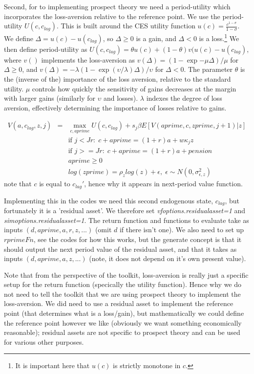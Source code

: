 Second, for to implementing prospect theory we need a period-utility which incorporates the loss-aversion relative to the reference point. We use the period-utility $U(c,c_{lag})$. This is built around the CES utility function $u(c)=\frac{c^{1-\sigma}}{1-\sigma}$. We define $\Delta=u(c)-u(c_{lag})$, so $\Delta \geq 0$ is a gain, and $\Delta <0$ is a loss.\footnote{It is important here that $u(c)$ is strictly monotone in $c$.} We then define period-utility as $U(c,c_{lag})=\theta u(c)+ (1-\theta) v(u(c)-u(c_{lag})$, where $v()$ implements the loss-aversion as  $v(\Delta)=(1-\exp{-\mu \Delta})/\mu$ for $\Delta \geq 0$, and $v(\Delta)=-\lambda (1- \exp{(\upsilon/\lambda)\Delta})/\upsilon$ for $\Delta < 0$. The parameter $\theta$ is the (inverse of the) importance of the loss aversion, relative to the standard utility. $\mu$ controls how quickly the sensitivity of gains decreases at the margin with larger gains (similarly for $\upsilon$ and losses). $\lambda$ indexes the degree of loss aversion, effectively determining the importance of losses relative to gains.

\begin{eqnarray*}
 V(a,c_{lag},z,j)&=& \max_{c,aprime} U(c,c_{lag})+ s_j \beta E[V(aprime,c,zprime,j+1)|z] \\
&& \text{if }j<Jr: \; c+aprime=(1+r)a+w \kappa_j z\\
&& \text{if }j>=Jr: \; c+aprime=(1+r)a +pension\\
&& aprime\geq 0 \\
&& log(zprime)=\rho_z log(z) + \epsilon, \; \epsilon \sim N(0,\sigma_{\epsilon,z}^2)
\end{eqnarray*}
note that $c$ is equal to $c_{lag}'$, hence why it appears in next-period value function.

Implementing this in the codes we need this second endogenous state, $c_{lag}$, but fortunately it is a 'residual asset'. We therefore set \textit{vfoptions.residualasset=1} and  \textit{simoptions.residualasset=1}. The return function and functions to evaluate take as inputs $(d,aprime,a,r,z,...)$ (omit $d$ if there isn't one). We also need to set up $rprimeFn$, see the codes for how this works, but the generate concept is that it should output the next period value of the residual asset, and that it takes as inputs $(d,aprime,a,z,...)$ (note, it does not depend on it's own present value).

Note that from the perspective of the toolkit, loss-aversion is really just a specific setup for the return function (specically the utility function). Hence why we do not need to tell the toolkit that we are using prospect theory to implement the loss-aversion. We did need to use a residual asset to implement the reference point (that determines what is a loss/gain), but mathematically we could define the reference point however we like (obviously we want something economically reasonable); residual assets are not specific to prospect theory and can be used for various other purposes.



